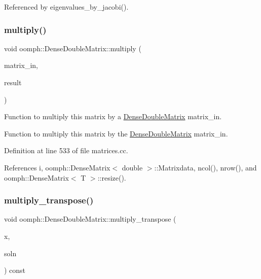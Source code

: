Referenced by eigenvalues\+\_\+by\+\_\+jacobi().

\mbox{\label{classoomph_1_1DenseDoubleMatrix_aab687b1136f0265434ada2684aa1b0a4}} 
\subsubsection{\texorpdfstring{multiply()}{multiply()}\hspace{0.1cm}{\footnotesize\ttfamily [2/2]}}
{\footnotesize\ttfamily void oomph\+::\+Dense\+Double\+Matrix\+::multiply (\begin{DoxyParamCaption}\item[{const \hyperlink{classoomph_1_1DenseDoubleMatrix}{Dense\+Double\+Matrix} \&}]{matrix\+\_\+in,  }\item[{\hyperlink{classoomph_1_1DenseDoubleMatrix}{Dense\+Double\+Matrix} \&}]{result }\end{DoxyParamCaption})}



Function to multiply this matrix by a \hyperlink{classoomph_1_1DenseDoubleMatrix}{Dense\+Double\+Matrix} matrix\+\_\+in. 

Function to multiply this matrix by the \hyperlink{classoomph_1_1DenseDoubleMatrix}{Dense\+Double\+Matrix} matrix\+\_\+in. 

Definition at line 533 of file matrices.\+cc.



References i, oomph\+::\+Dense\+Matrix$<$ double $>$\+::\+Matrixdata, ncol(), nrow(), and oomph\+::\+Dense\+Matrix$<$ T $>$\+::resize().

\mbox{\label{classoomph_1_1DenseDoubleMatrix_a7cc35997d87b4ee7b77fcaaf85eeeaec}} 
\subsubsection{\texorpdfstring{multiply\+\_\+transpose()}{multiply\_transpose()}}
{\footnotesize\ttfamily void oomph\+::\+Dense\+Double\+Matrix\+::multiply\+\_\+transpose (\begin{DoxyParamCaption}\item[{const \hyperlink{classoomph_1_1DoubleVector}{Double\+Vector} \&}]{x,  }\item[{\hyperlink{classoomph_1_1DoubleVector}{Double\+Vector} \&}]{soln }\end{DoxyParamCaption}) const\hspace{0.3cm}{\ttfamily [virtual]}}



